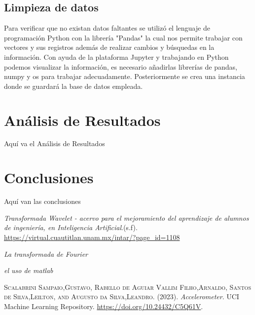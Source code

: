 \documentclass[11pt,a4paper]{article}
\begin{document}
\subsection{Limpieza de datos}
Para verificar que no existan datos faltantes se utilizó el lenguaje de programación Python con la librería "Pandas" la cual nos permite trabajar con vectores y sus registros además de realizar cambios y búsquedas en la información. Con ayuda de la plataforma Jupyter y trabajando en Python podemos visualizar la información, es necesario añadirlas librerías de pandas, numpy y os para trabajar adecuadamente. Posteriormente se crea una instancia donde se guardará la base de datos empleada.
\section{Análisis de Resultados}
Aquí va el Análisis de Resultados
\section{Conclusiones}
Aquí van las conclusiones


\begin{thebibliography}{x}
	 \textit{Transformada Wavelet - acervo para el mejoramiento del aprendizaje de alumnos de ingeniería, en Inteligencia Artificial}.(s.f). \url{https://virtual.cuautitlan.unam.mx/intar/?page\_id=1108}
	
	 \textit{La transformada de Fourier}
	
	 \textit{el uso de matlab}
	
	 \textsc{Scalabrini Sampaio,Gustavo, Rabello de Aguiar Vallim Filho,Arnaldo, Santos de Silva,Leilton, and Augusto da Silva,Leandro}. (2023). \textit{Accelerometer}. UCI Machine Learning Repository. \url{https://doi.org/10.24432/C5Q61V}.
\end{thebibliography}
\end{document}
